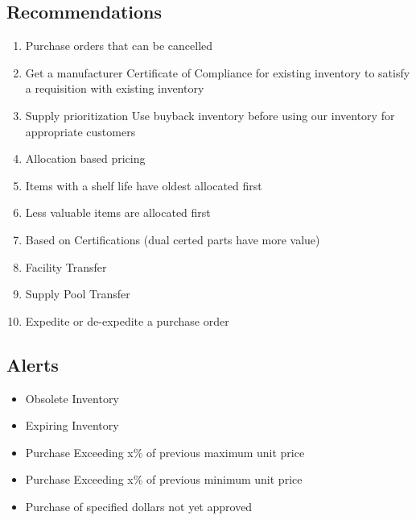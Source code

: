 \documentclass[letterpaper,10pt,english]{sphinxmanual}
\begin{document}
\subsection{Recommendations}
\label{BusinessProcessReengineering:recommendations}\begin{enumerate}
\item {} 
Purchase orders that can be cancelled

\item {} 
Get a manufacturer Certificate of Compliance for existing inventory
to satisfy a requisition with existing inventory

\item {} 
Supply prioritization Use buyback inventory before using our
inventory for appropriate customers

\item {} 
Allocation based pricing

\item {} 
Items with a shelf life have oldest allocated first

\item {} 
Less valuable items are allocated first

\item {} 
Based on Certifications (dual certed parts have more value)

\item {} 
Facility Transfer

\item {} 
Supply Pool Transfer

\item {} 
Expedite or de-expedite a purchase order

\end{enumerate}


\subsection{Alerts}
\label{BusinessProcessReengineering:alerts}\begin{itemize}
\item {} 
Obsolete Inventory

\item {} 
Expiring Inventory

\item {} 
Purchase Exceeding x\% of previous maximum unit price

\item {} 
Purchase Exceeding x\% of previous minimum unit price

\item {} 
Purchase of specified dollars not yet approved

\end{itemize}
\end{document}
